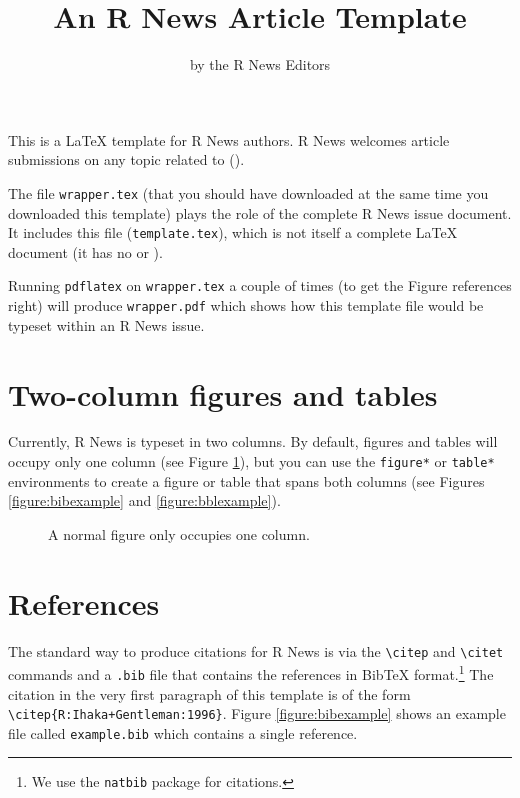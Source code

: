 \title{An R News Article Template}
\author{by the R News Editors}

\maketitle

This is a \LaTeX{} template for R News authors.
R News welcomes article submissions on any topic related to 
\R{} (\citep{R:Ihaka+Gentleman:1996}).

The file {\tt wrapper.tex} (that you should have downloaded
at the same time you downloaded this template) plays the role
of the complete R News issue document.  It includes this file
({\tt template.tex}), which is not itself a complete
\LaTeX{} document (it has no \verb|| or
\verb||).

Running {\tt pdflatex} on {\tt wrapper.tex} a couple of times
(to get the Figure references right) will produce
{\tt wrapper.pdf} which shows how this template file would be 
typeset within an R News issue.

\section*{Two-column figures and tables}

Currently, R News is typeset in two columns.
By default, figures and tables will occupy only one
column (see Figure \ref{figure:onecolfig}), 
but you can use the \verb|figure*| or
\verb|table*| environments to create a figure or
table that spans both columns (see Figures \ref{figure:bibexample}
and \ref{figure:bblexample}).

\begin{figure}
\vspace*{.1in}
\caption{\label{figure:onecolfig}
A normal figure only occupies one column.}
\end{figure}

\section*{References}

The standard way to produce citations for R News is via the 
\verb|\citep| and \verb|\citet| commands 
and a {\tt .bib} file that contains the 
references in {\sc Bib}\TeX{} format.\footnote{We use the {\tt natbib}
package for citations.}  The citation in the very first 
paragraph of this template is of the form
\verb|\citep{R:Ihaka+Gentleman:1996}|.  Figure \ref{figure:bibexample}
shows an example file called {\tt example.bib} which contains 
a single reference.  

